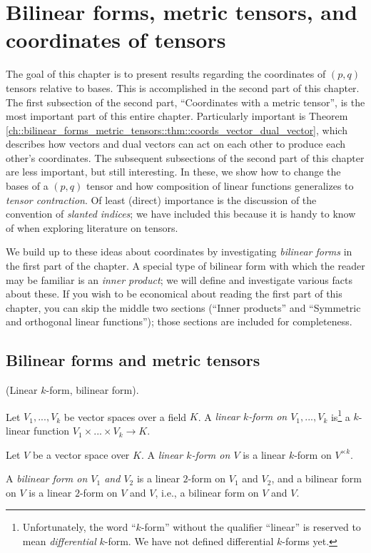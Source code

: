 \chapter{Bilinear forms, metric tensors, and coordinates of tensors}
\label{ch::bilinear_forms_metric_tensors}

The goal of this chapter is to present results regarding the coordinates of $(p, q)$ tensors relative to bases. This is accomplished in the second part of this chapter. The first subsection of the second part, ``Coordinates with a metric tensor'', is the most important part of this entire chapter. Particularly important is Theorem \ref{ch::bilinear_forms_metric_tensors::thm::coords_vector_dual_vector},
which describes how vectors and dual vectors can act on each other to produce each other's coordinates. The subsequent subsections of the second part of this chapter are less important, but still interesting. In these, we show how to change the bases of a $(p, q)$ tensor and how composition of linear functions generalizes to \textit{tensor contraction}. Of least (direct) importance is the discussion of the convention of \textit{slanted indices}; we have included this because it is handy to know of when exploring literature on tensors.

We build up to these ideas about coordinates by investigating \textit{bilinear forms} in the first part of the chapter. A special type of bilinear form with which the reader may be familiar is an \textit{inner product}; we will define and investigate various facts about these. If you wish to be economical about reading the first part of this chapter, you can skip the middle two sections (``Inner products'' and ``Symmetric and orthogonal linear functions''); those sections are included for completeness.

\section{Bilinear forms and metric tensors}

\begin{defn}
    (Linear $k$-form, bilinear form).
    
    Let $V_1, ..., V_k$ be vector spaces over a field $K$. A \textit{linear $k$-form on $V_1, ..., V_k$} is\footnote{Unfortunately, the word ``$k$-form'' without the qualifier ``linear'' is reserved to mean \textit{differential} $k$-form. We have not defined differential $k$-forms yet.} a $k$-linear function ${V_1 \times ... \times V_k \rightarrow K}$.
    
    Let $V$ be a vector space over $K$. A \textit{linear $k$-form on $V$} is a linear $k$-form on $V^{\times k}$.
    
    A \textit{bilinear form on $V_1$ and $V_2$} is a linear $2$-form on $V_1$ and $V_2$, and a bilinear form on $V$ is a linear $2$-form on $V$ and $V$, i.e., a bilinear form on $V$ and $V$.
\end{defn}

